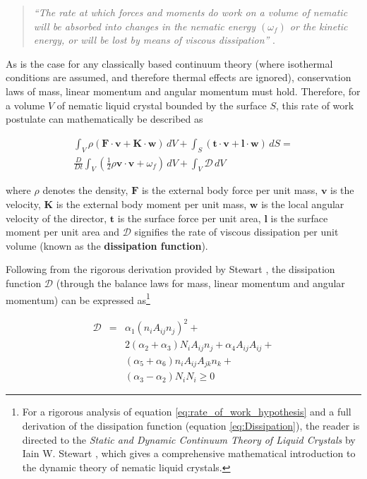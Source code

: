 \begin{quote}
\textit{``The rate at which forces and moments do work on a volume of nematic will be absorbed into changes in the nematic energy $\left(\omega_f\right)$ or the kinetic energy, or will be lost by means of viscous dissipation''} \cite{Stewart2004}.
\end{quote}

\noindent As is the case for any classically based continuum theory (where isothermal conditions are assumed, and therefore thermal effects are ignored), conservation laws of mass, linear momentum and angular momentum must hold. Therefore, for a volume $V$ of nematic liquid crystal bounded by the surface $S$, this rate of work postulate can mathematically be described as 

\begin{multline}
\int_V \! \rho\left(\mathbf{F}\cdot\mathbf{v}+\mathbf{K}\cdot\mathbf{w}\right)\,dV+\int_S\!\left(\mathbf{t}\cdot\mathbf{v}+\mathbf{l}\cdot\mathbf{w}\right)\,dS= \\ \frac{D}{Dt}\int_V\!\left(\frac{1}{2}\rho\mathbf{v}\cdot\mathbf{v}+\omega_f\right)\,dV+\int_V\!\mathcal{D}\,dV
\label{eq:rate_of_work_hypothesis}
\end{multline}

\noindent where $\rho$ denotes the density, $\mathbf{F}$ is the external body force per unit mass, $\mathbf{v}$ is the velocity, $\mathbf{K}$ is the external body moment per unit mass, $\mathbf{w}$ is the local angular velocity of the director, $\mathbf{t}$ is the surface force per unit area, $\mathbf{l}$ is the surface moment per unit area and $\mathcal{D}$ signifies the rate of viscous dissipation per unit volume (known as the \textbf{dissipation function}).

Following from the rigorous derivation provided by Stewart \cite{Stewart2004}, the dissipation function $\mathcal{D}$ (through the balance laws for mass, linear momentum and angular momentum) can be expressed as\footnote{For a rigorous analysis of equation \ref{eq:rate_of_work_hypothesis} and a full derivation of the dissipation function (equation \ref{eq:Dissipation}), the reader is directed to the \textit{Static and Dynamic Continuum Theory of Liquid Crystals} by Iain W. Stewart \cite{Stewart2004}, which gives a comprehensive mathematical introduction to the dynamic theory of nematic liquid crystals.}

\begin{eqnarray}
\nonumber\mathcal{D}&=&\alpha_1\left(n_iA_{ij}n_j\right)^2+ \\
&&2\left(\alpha_2+\alpha_3\right)N_iA_{ij}n_j+\alpha_4A_{ij}A_{ij}+ \\
&&\left(\alpha_5+\alpha_6\right)n_iA_{ij}A_{jk}n_k+ \\
&&\left(\alpha_3-\alpha_2\right)N_iN_i\geq0
\label{eq:Dissipation}
\end{eqnarray}

